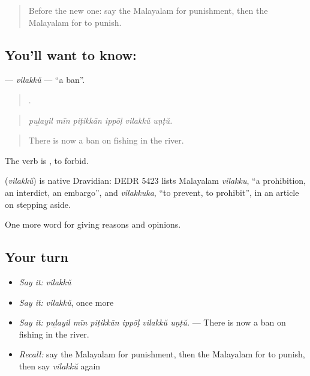 \label{lesson:ML-C418-vilakku}



\begin{quote}
Before the new one: say the Malayalam for punishment, then the Malayalam for to punish.
\end{quote}

\subsection*{You'll want to know: }
\textbf{} — \emph{vilakkŭ} — \textquotedblleft{}a ban\textquotedblright{}.

\begin{quote}
     .
\end{quote}

\begin{quote}
\emph{puḻayil mīn piṭikkān ippōḷ vilakkŭ uṇṭŭ.}
\end{quote}

\begin{quote}
There is now a ban on fishing in the river.
\end{quote}

The verb is , to forbid.

\begin{cousinweb}
\textbf{} (\emph{vilakkŭ}) is native Dravidian: DEDR 5423 lists Malayalam \emph{vilakku}, \textquotedblleft{}a prohibition, an interdict, an embargo\textquotedblright{}, and \emph{vilakkuka}, \textquotedblleft{}to prevent, to prohibit\textquotedblright{}, in an article on stepping aside.
\end{cousinweb}

\begin{grammarlens}[title={What you've built}]
One more word for giving reasons and opinions.
\end{grammarlens}

\subsection*{Your turn}
\begin{itemize}
\raggedright
  \item \emph{Say it:} \emph{vilakkŭ}
  \item \emph{Say it:} \emph{vilakkŭ}, once more
  \item \emph{Say it:} \emph{puḻayil mīn piṭikkān ippōḷ vilakkŭ uṇṭŭ.} — There is now a ban on fishing in the river.
  \item \emph{Recall:} say the Malayalam for punishment, then the Malayalam for to punish, then say \emph{vilakkŭ} again
\end{itemize}

